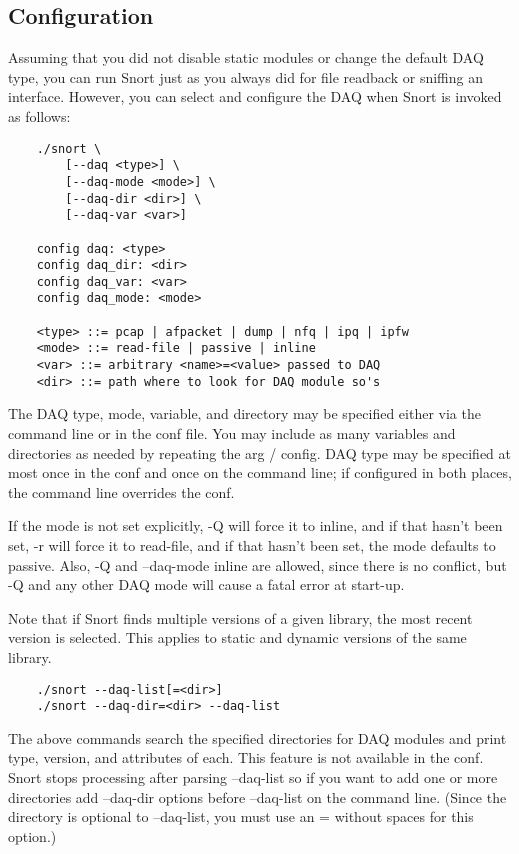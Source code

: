 \documentclass[english]{report}
\begin{document}
\subsection{Configuration}

Assuming that you did not disable static modules or change the default DAQ
type, you can run Snort just as you always did for file readback or sniffing an
interface.  However, you can select and configure the DAQ when Snort is invoked
as follows:

\begin{verbatim}
    ./snort \
        [--daq <type>] \
        [--daq-mode <mode>] \
        [--daq-dir <dir>] \
        [--daq-var <var>]

    config daq: <type>
    config daq_dir: <dir>
    config daq_var: <var>
    config daq_mode: <mode>

    <type> ::= pcap | afpacket | dump | nfq | ipq | ipfw
    <mode> ::= read-file | passive | inline
    <var> ::= arbitrary <name>=<value> passed to DAQ
    <dir> ::= path where to look for DAQ module so's
\end{verbatim}

The DAQ type, mode, variable, and directory may be specified either via the 
command line or in the conf file.  You may include as many variables and 
directories as needed by repeating the arg / config.  DAQ type may be specified
at most once in the conf and once on the command line; if configured in both
places, the command line overrides the conf.


If the mode is not set explicitly, -Q will force it to inline, and if that
hasn't been set, -r will force it to read-file, and if that hasn't been set,
the mode defaults to passive.  Also, -Q and --daq-mode inline are allowed,
since there is no conflict, but -Q and any other DAQ mode will cause a fatal
error at start-up.

Note that if Snort finds multiple versions of a given library, the most recent
version is selected.  This applies to static and dynamic versions of the same
library.

\begin{verbatim}
    ./snort --daq-list[=<dir>]
    ./snort --daq-dir=<dir> --daq-list
\end{verbatim}

The above commands search the specified directories for DAQ modules and print
type, version, and attributes of each.  This feature is not available in the
conf.  Snort stops processing after parsing --daq-list so if you want to add
one or more directories add --daq-dir options before --daq-list on the command
line.  (Since the directory is optional to --daq-list, you must use an =
without spaces for this option.)
\end{document}
